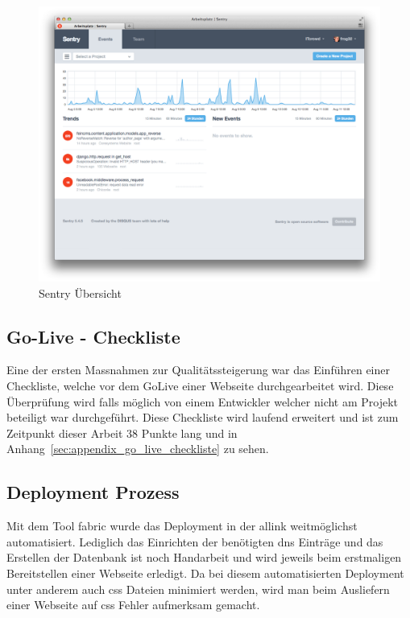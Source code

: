 \begin{figure}[h]
\centering
\includegraphics[width=1\textwidth]{images/sentry.png}
\caption{Sentry Übersicht}
\label{fig:sentry_index}
\end{figure}

\subsection{Go-Live - Checkliste}
\label{sub:go_live_checkliste}
Eine der ersten Massnahmen zur Qualitätssteigerung war das Einführen einer Checkliste, welche vor dem GoLive einer Webseite durchgearbeitet wird. Diese Überprüfung wird falls möglich von einem Entwickler welcher nicht am Projekt beteiligt war durchgeführt. Diese Checkliste wird laufend erweitert und ist zum Zeitpunkt dieser Arbeit 38 Punkte lang und in Anhang~\ref{sec:appendix_go_live_checkliste} zu sehen.

\subsection{Deployment Prozess}
\label{sub:deployment_prozess}
Mit dem Tool fabric wurde das Deployment in der allink weitmöglichst automatisiert. Lediglich das Einrichten der benötigten \acrshort{dns} Einträge und das Erstellen der Datenbank ist noch Handarbeit und wird jeweils beim erstmaligen Bereitstellen einer Webseite erledigt. Da bei diesem automatisierten Deployment unter anderem auch \acrshort{css} Dateien minimiert werden, wird man beim Ausliefern einer Webseite auf \acrshort{css} Fehler aufmerksam gemacht.